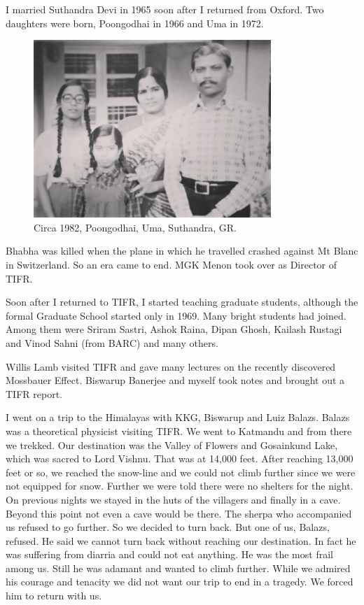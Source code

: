 I married Suthandra Devi in 1965 soon after I 
returned from Oxford. Two daughters were born, Poongodhai in 1966 and 
Uma in 1972.
\begin{figure}
\centering
\includegraphics[width=0.8\textwidth]{images/Rajaji-03.jpg}
\caption{ Circa 1982, Poongodhai, Uma, Suthandra, GR.}
\end{figure}
Bhabha was killed when the plane in which he travelled crashed against 
Mt Blanc in Switzerland. So an era came to end. MGK Menon took over as 
Director of TIFR.

Soon after I returned to TIFR, I started teaching graduate students, 
although the formal Graduate School started only in 1969. Many bright 
students had joined. Among them were Sriram Sastri, Ashok Raina, Dipan 
Ghosh, Kailash Rustagi and Vinod Sahni (from BARC) and many others.

Willis Lamb visited TIFR and gave many lectures on the recently 
discovered Mossbauer Effect. Biswarup Banerjee and myself took notes and 
brought out a TIFR report.
                 
I went on a trip to the Himalayas with KKG, Biswarup and Luiz Balazs. 
Balazs was a theoretical physicist visiting TIFR. We went to Katmandu 
and from there we trekked. Our destination was the Valley of Flowers and 
Gosainkund Lake, which was sacred to Lord Vishnu. That was at 14,000 
feet. After reaching 13,000 feet or so, we reached the snow-line and we 
could not climb further since we were not equipped for snow. Further we 
were told there were no shelters for the night. On previous nights we 
stayed in the huts of the villagers and finally in a cave. Beyond this 
point not even a cave would be there. The sherpa who accompanied us 
refused to go further. So we decided to turn back. But one of us, 
Balazs, refused. He said we cannot turn back without reaching our 
destination. In fact he was suffering from diarria and could not eat 
anything. He was the most frail among us. Still he was adamant and 
wanted to climb further. While we admired his courage and tenacity we 
did not want our trip to end in a tragedy. We forced him to return with 
us.


